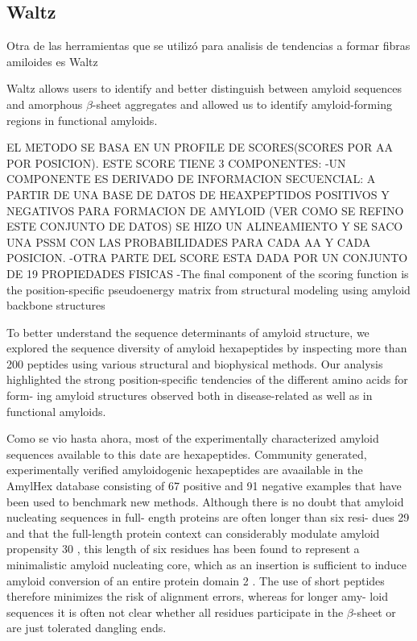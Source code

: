 \subsection{Waltz}


Otra de las herramientas que se utilizó para analisis de tendencias a formar fibras amiloides es Waltz \cite{maurer2010exploring}

Waltz allows users to identify and better distinguish between amyloid sequences and amorphous $\beta$-sheet aggregates and allowed us to identify
amyloid-forming regions in functional amyloids.

EL METODO SE BASA EN UN PROFILE DE SCORES(SCORES POR AA POR POSICION). ESTE SCORE TIENE 3 COMPONENTES:
-UN COMPONENTE ES DERIVADO DE INFORMACION SECUENCIAL: A PARTIR DE UNA BASE DE DATOS DE HEAXPEPTIDOS POSITIVOS Y NEGATIVOS PARA FORMACION DE AMYLOID (VER COMO SE REFINO ESTE CONJUNTO DE DATOS) 
SE HIZO UN ALINEAMIENTO Y SE SACO UNA PSSM CON LAS PROBABILIDADES PARA CADA AA Y CADA POSICION.
-OTRA PARTE DEL SCORE ESTA DADA POR UN CONJUNTO DE 19 PROPIEDADES FISICAS 
-The final component of the scoring function is the position-specific pseudoenergy matrix from structural modeling using amyloid backbone structures


To better understand the sequence determinants of amyloid structure, we explored the sequence diversity of amyloid hexapeptides by inspecting more than 200 peptides using various
structural and biophysical methods.
Our analysis highlighted the strong
position-specific tendencies of the different amino acids for form-
ing amyloid structures observed both in disease-related as well as
in functional amyloids.

Como se vio hasta ahora, most of the experimentally characterized amyloid sequences available to this date are hexapeptides.
Community generated, experimentally
verified amyloidogenic hexapeptides are avaailable in the AmylHex 
database consisting of 67 positive and 91 
negative examples that have been used to benchmark new methods.
Although there is no doubt that amyloid nucleating sequences in full- ength proteins are often longer than six resi-
dues 29 and that the full-length protein context can considerably
modulate amyloid propensity 30 , this length of six residues has
been found to represent a minimalistic amyloid nucleating core,
which as an insertion is sufficient to induce amyloid conversion
of an entire protein domain 2 . The use of short peptides therefore
minimizes the risk of alignment errors, whereas for longer amy-
loid sequences it is often not clear whether all residues participate
in the $\beta$-sheet or are just tolerated dangling ends.

